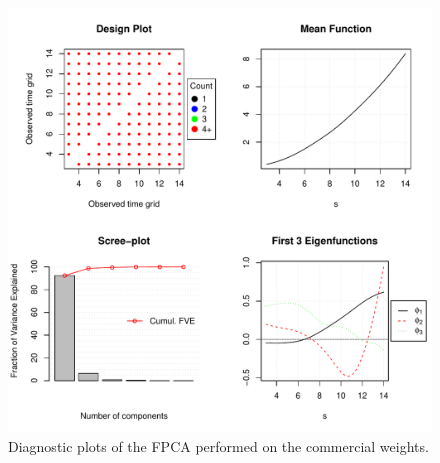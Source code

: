 \documentclass[11pt]{article}\usepackage[]{graphicx}\usepackage[]{color}
\makeatletter
\def\maxwidth{ %
  \ifdim\Gin@nat@width>\linewidth
    \linewidth
  \else
    \Gin@nat@width
  \fi
}
\newenvironment{knitrout}{}{} %
\makeatother
\begin{document}
\begin{knitrout}
\color{fgcolor}\begin{figure}
\includegraphics[width=\maxwidth]{figure/weightFPCAd-1} \caption[Diagnostic plots of the FPCA performed on the commercial weights]{Diagnostic plots of the FPCA performed on the commercial weights.}\label{fig:weightFPCAd}
\end{figure}


\end{knitrout}
\end{document}

